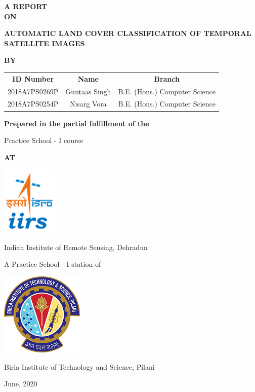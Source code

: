 \documentclass[12pt, a4paper]{report}
\begin{document}
\begin{titlepage}
\vspace*{0.3cm}
\begin{center} \textbf{A REPORT\\ON} \end{center}
\begin{center} \textbf{{\Large AUTOMATIC LAND COVER CLASSIFICATION OF TEMPORAL SATELLITE IMAGES}} \end{center}
\begin{center} \textbf{BY} \end{center}
\begin{center}
	\begin{tabular}{c c c}
		\textbf{ID Number} & \textbf{Name} & \textbf{Branch} \\
		2018A7PS0269P & Guntaas Singh & B.E. (Hons.) Computer Science \\
		2018A7PS0254P & Nisarg Vora  & B.E. (Hons.) Computer Science \\
	\end{tabular} 
\end{center}
\begin{onehalfspace}
\begin{center} \textbf{Prepared in the partial fulfillment of the} \end{center}
\begin{center} Practice School - I course \end{center}
\begin{center} \textbf{AT} \end{center}
\begin{center} \includegraphics{iirs.png} \end{center}
\begin{center} {\Large Indian Institute of Remote Sensing, Dehradun} \end{center}
\begin{center} A Practice School - I station of \end{center}
\begin{center} {\includegraphics{bits.png}} \end{center}
\begin{center} {\Large Birla Institute of Technology and Science, Pilani} \end{center}
\begin{center} June, 2020 \end{center}
\end{onehalfspace}
\end{titlepage}
\end{document}
